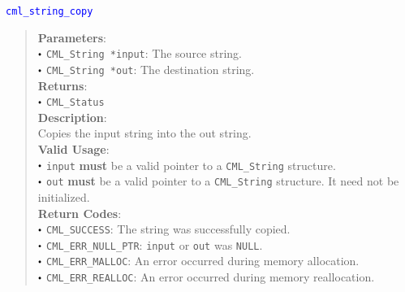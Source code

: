 \documentclass[a4paper,oneside,8pt]{extarticle}
\newcommand{\function}[1]{
  \noindent\textcolor{blue}{\texttt{#1}}
  \vspace{-0.3em}
}
\renewcommand{\dot}{\raisebox{0.3ex}{\scalebox{0.6}{$\bullet$}}}
\theoremstyle{definition}
\begin{document}
\function{cml\_string\_copy}
\begin{quote}
  \textbf{Parameters}: \\
  $\dot$ \texttt{CML\_String *input}: The source string. \\
  $\dot$ \texttt{CML\_String *out}: The destination string. \\
  \textbf{Returns}: \\
  $\dot$ \texttt{CML\_Status} \\
  
  \vspace{-0.75em}
  \textbf{Description}: \\
  Copies the input string into the out string. \\

  \vspace{-0.75em}
  \textbf{Valid Usage}: \\
  $\dot$ \texttt{input} \textbf{must} be a valid pointer to a \texttt{CML\_String} structure. \\
  $\dot$ \texttt{out} \textbf{must} be a valid pointer to a \texttt{CML\_String} structure. It need not be initialized. \\

  \vspace{-0.75em}
  \textbf{Return Codes}: \\
  $\dot$ \texttt{CML\_SUCCESS}: The string was successfully copied. \\
  $\dot$ \texttt{CML\_ERR\_NULL\_PTR}: \texttt{input} or \texttt{out} was \texttt{NULL}. \\
  $\dot$ \texttt{CML\_ERR\_MALLOC}: An error occurred during memory allocation. \\
  $\dot$ \texttt{CML\_ERR\_REALLOC}: An error occurred during memory reallocation. \\
\end{quote}
\end{document}
